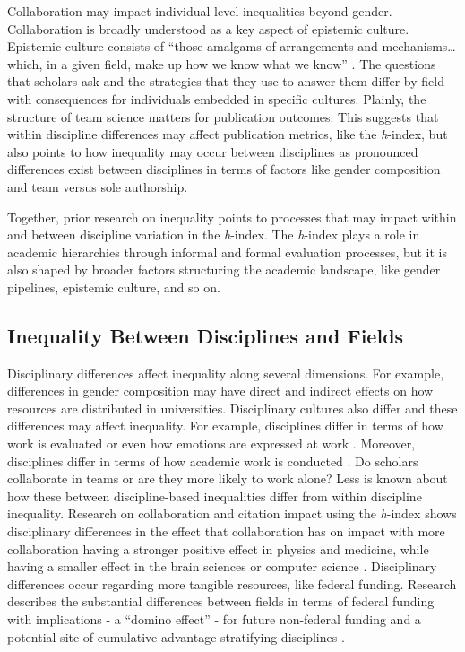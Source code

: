 \documentclass[
  10pt,
  letterpaper,
]{article}
\begin{document}
Collaboration may impact individual-level inequalities beyond gender.
Collaboration is broadly understood as a key aspect of epistemic
culture. Epistemic culture consists of ``those amalgams of arrangements
and mechanisms\ldots which, in a given field, make up how we know what
we know'' \citep[pg. 1]{cetina_epistemic_1999}. The questions that
scholars ask and the strategies that they use to answer them differ by
field with consequences for individuals embedded in specific cultures.
Plainly, the structure of team science matters for publication outcomes.
This suggests that within discipline differences may affect publication
metrics, like the \emph{h}-index, but also points to how inequality may
occur between disciplines as pronounced differences exist between
disciplines in terms of factors like gender composition and team versus
sole authorship.

Together, prior research on inequality points to processes that may
impact within and between discipline variation in the \emph{h}-index.
The \emph{h}-index plays a role in academic hierarchies through informal
and formal evaluation processes, but it is also shaped by broader
factors structuring the academic landscape, like gender pipelines,
epistemic culture, and so on.

\subsection{Inequality Between Disciplines and
Fields}\label{inequality-between-disciplines-and-fields}

Disciplinary differences affect inequality along several dimensions. For
example, differences in gender composition may have direct and indirect
effects on how resources are distributed in universities. Disciplinary
cultures also differ and these differences may affect inequality. For
example, disciplines differ in terms of how work is evaluated
\citep{lamont_how_2009} or even how emotions are expressed at work
\citep{koppman_joy_2015}. Moreover, disciplines differ in terms of how
academic work is conducted \citep{huang_historical_2020}. Do scholars
collaborate in teams or are they more likely to work alone? Less is
known about how these between discipline-based inequalities differ from
within discipline inequality. Research on collaboration and citation
impact using the \emph{h}-index shows disciplinary differences in the
effect that collaboration has on impact with more collaboration having a
stronger positive effect in physics and medicine, while having a smaller
effect in the brain sciences or computer science
\citep{parish_dynamics_2018}. Disciplinary differences occur regarding
more tangible resources, like federal funding. Research describes the
substantial differences between fields in terms of federal funding with
implications - a ``domino effect'' - for future non-federal funding and
a potential site of cumulative advantage stratifying disciplines
\citep{lanahan_domino_2016, lynn_15_2021}.
\end{document}
